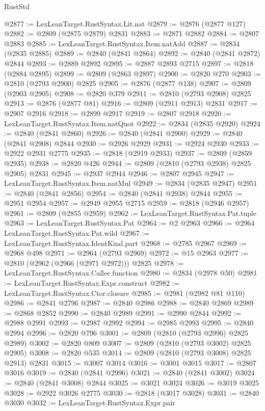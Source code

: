 \begin{lexlean}{RustStd}
\begin{coremodule}
@2877 := LexLeanTarget.RustSyntax.Lit.nat
@2879 := @2876 (@2877 @127)
@2882 := @2809 (@2875 @2879) @2831
@2883 := @2871 @2882
@2884 := @2807 @2883
@2885 := LexLeanTarget.RustSyntax.Item.natAdd
@2887 := @2834 (@2835 @2885)
@2889 := @2840 (@2841 @2864)
@2892 := @2840 (@2841 @2872) @2844
@2893 := @2889 @2892
@2895 := @2887 @2893 @2715
@2897 := @2818 (@2884 @2895)
@2899 := @2809 (@2863 @2897)
@2900 := @2820 @270
@2903 := @2810 (@2793 @2900) @2825
@2905 := @2876 (@2877 @138)
@2907 := @2809 (@2903 @2905)
@2908 := @2820 @379
@2911 := @2810 (@2793 @2908) @2825
@2913 := @2876 (@2877 @81)
@2916 := @2809 (@2911 @2913) @2831
@2917 := @2907 @2916
@2918 := @2899 @2917
@2919 := @2807 @2918
@2920 := LexLeanTarget.RustSyntax.Item.natQuot
@2922 := @2834 (@2835 @2920)
@2924 := @2840 (@2841 @2860)
@2926 := @2840 (@2841 @2900)
@2929 := @2840 (@2841 @2908) @2844
@2930 := @2926 @2929
@2931 := @2924 @2930
@2933 := @2922 @2931 @2775
@2935 := @2818 (@2919 @2933)
@2937 := @2809 (@2859 @2935)
@2938 := @2820 @426
@2944 := @2809 (@2810 (@2793 @2938) @2825 @2905) @2831
@2945 := @2937 @2944
@2946 := @2807 @2945
@2947 := LexLeanTarget.RustSyntax.Item.natMul
@2949 := @2834 (@2835 @2947)
@2951 := @2840 (@2841 @2856)
@2954 := @2840 (@2841 @2938) @2844
@2955 := @2951 @2954
@2957 := @2949 @2955 @2715
@2959 := @2818 (@2946 @2957)
@2961 := @2809 (@2855 @2959)
@2962 := LexLeanTarget.RustSyntax.Pat.tuple
@2963 := LexLeanTarget.RustSyntax.Pat
@2964 := @2 @2963
@2966 := @2964 LexLeanTarget.RustSyntax.Pat.wild
@2967 := LexLeanTarget.RustSyntax.IdentKind.part
@2968 := @2785 @2967
@2969 := @2968 @498
@2971 := @2964 (@2793 @2969)
@2972 := @15 @2963
@2977 := @2810 (@2962 (@2966 (@2971 @2972))) @2825
@2978 := LexLeanTarget.RustSyntax.Callee.function
@2980 := @2834 (@2978 @50)
@2981 := LexLeanTarget.RustSyntax.Expr.construct
@2982 := LexLeanTarget.RustSyntax.Ctor.closure
@2985 := @2981 (@2982 @81 @110)
@2986 := @2841 @2796
@2987 := @2840 @2986
@2988 := @2840 @2869
@2989 := @2868 @2852
@2990 := @2840 @2989
@2991 := @2990 @2844
@2992 := @2988 @2991
@2993 := @2987 @2992
@2994 := @2985 @2993
@2995 := @2840 @2994
@2996 := @2820 @796
@3001 := @2809 (@2810 (@2793 @2996) @2825 @2989)
@3002 := @2820 @809
@3007 := @2809 (@2810 (@2793 @3002) @2825 @2905)
@3008 := @2820 @535
@3014 := @2809 (@2810 (@2793 @3008) @2825 @2913) @2831
@3015 := @3007 @3014
@3016 := @3001 @3015
@3017 := @2807 @3016
@3019 := @2840 (@2841 @2996)
@3021 := @2840 (@2841 @3002)
@3024 := @2840 (@2841 @3008) @2844
@3025 := @3021 @3024
@3026 := @3019 @3025
@3028 := @2922 @3026 @2775
@3030 := @2818 (@3017 @3028)
@3031 := @2840 @3030
@3032 := LexLeanTarget.RustSyntax.Expr.pair

\end{coremodule}
\end{lexlean}

